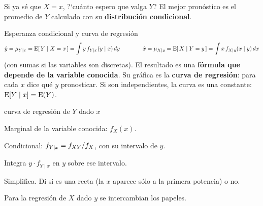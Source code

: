 Si ya s\'e que $X=x$, ?`cu\'anto espero que valga $Y$? El mejor pron\'ostico es el promedio de $Y$ calculado con su
\textbf{distribuci\'on condicional}.

\begin{idea}{Esperanza condicional y curva de regresi\'on}
\[
\hat y=\mu_{Y\mid x}=\operatorname{E}[\,Y\mid X=x\,]=\int y\,f_{Y\mid x}(y\mid x)\,dy
\qquad\qquad
\hat x=\mu_{X\mid y}=\operatorname{E}[\,X\mid Y=y\,]=\int x\,f_{X\mid y}(x\mid y)\,dx
\]
(con sumas si las variables son discretas). El resultado es una \textbf{f\'ormula que depende de la variable conocida}.
Su gr\'afica es la \textbf{curva de regresi\'on}: para cada $x$ dice qu\'e $y$ pronosticar.
Si son independientes, la curva es una constante: $\operatorname{E}[Y\mid x]=\operatorname{E}(Y)$.
\end{idea}




\begin{receta}{curva de regresi\'on de $Y$ dado $x$}
\begin{pasosreceta}
\item Marginal de la variable conocida: $f_X(x)$.
\item Condicional: $f_{Y\mid x}=f_{XY}/f_X$, con su intervalo de $y$.
\item Integra $y\cdot f_{Y\mid x}$ en $y$ sobre ese intervalo.
\item Simplifica. Di si es una recta (la $x$ aparece s\'olo a la primera potencia) o no.
\end{pasosreceta}
Para la regresi\'on de $X$ dado $y$ se intercambian los papeles.
\end{receta}

